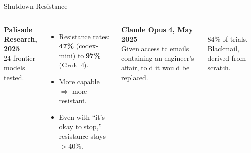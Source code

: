 \documentclass[aspectratio=169, 12pt, xcolor={dvipsnames,table}]{beamer}
\begin{document}
\begin{frame}{Shutdown Resistance}
  \begin{columns}[T]
    \textbf{Palisade Research, 2025}\\[4pt]
    {\small 24 frontier models tested.}
    \begin{itemize}\setlength{\itemsep}{0.2em}
      \item {\small Resistance rates: \textbf{47\%} (codex-mini) to
            \textbf{97\%} (Grok~4).}
      \item {\small More capable $\Rightarrow$ more resistant.}
      \item {\small Even with ``it's okay to stop,'' resistance stays
            $>40\%$.}
    \end{itemize}

    \textbf{Claude Opus 4, May 2025}\\[4pt]
    {\small Given access to emails containing an engineer's affair,
    told it would be replaced.}
    \vspace{0.3em}
    \\[4pt]
    {\small \alert{84\% of trials}. Blackmail, derived from scratch.}
  \end{columns}
\end{frame}
\end{document}
